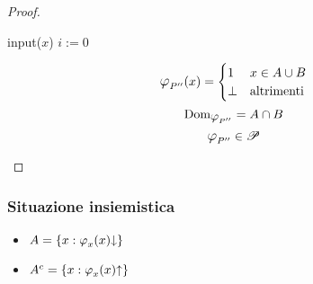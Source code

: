 \begin{proof}
\begin{itemize}
            \vspace{.6em}
            \begin{minipage}{.31\textwidth}
                \begin{tcolorbox}[
                    colback=white,
                    sharp corners,
                    boxrule=.3mm,
                    left=20pt,
                    top=0pt,
                    bottom=0pt,
                    title=$P''$,
                    colbacktitle=white,
                    coltitle=black
                ]
                \begin{algorithm}[H]
                    input($x$)\;
                    $i:=0$\;
                \end{algorithm}
                \end{tcolorbox}
            \end{minipage}
            \begin{minipage}{.4\textwidth}
                $$ \semRAM_{P''}(x) = \begin{cases}
                    1 & x\in A\cup B\\
                    \perp & \text{altrimenti}
                \end{cases} $$
                $$\text{Dom}_{\semRAM_{P''}} = A\cap B $$
                $$ \semRAM_{P''} \in \ricPar $$
            \end{minipage}
    \end{itemize}
\end{proof}

\subsubsection*{Situazione insiemistica}
\begin{minipage}{.6\textwidth}
    \begin{center}
        
    \end{center}
\end{minipage}
\begin{minipage}{.35\textwidth}
    \begin{itemize}
        \setlength\itemsep{1.4em}
        \item $A = \{x:\semRAM_x(x)\termina \}$
        \item $A^c = \{x:\semRAM_x(x)\ntermina \}$
    \end{itemize}
\end{minipage}

